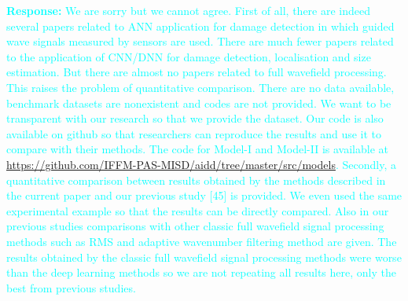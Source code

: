 \documentclass[11pt,a2paper]{report}
\begin{document}
	\textcolor{Cyan}{
		\textbf{Response:}
	We are sorry but we cannot agree. First of all, there are indeed several papers related to ANN application for damage detection in which guided wave signals measured by sensors are used. There are much fewer papers related to the application of CNN/DNN for damage detection, localisation and size estimation. But there are almost no papers related to full wavefield processing. This raises the problem of quantitative comparison. There are no data available, benchmark datasets are nonexistent and codes are not provided.
	We want to be transparent with our research so that we provide the dataset. Our code is also available on github so that researchers can reproduce the results and use it to compare with their methods. 
	The code for Model-I and Model-II is available at \url{https://github.com/IFFM-PAS-MISD/aidd/tree/master/src/models}.
	Secondly, a quantitative comparison between results obtained by the methods described in the current paper and our previous study [45] is provided. We even used the same experimental example so that the results can be directly compared. Also in our previous studies comparisons with other classic full wavefield signal processing methods such as RMS and adaptive wavenumber filtering method are given. The results obtained by the classic full wavefield signal processing methods were worse than the deep learning methods so we are not repeating all results here, only the best from previous studies.
	}

	\vspace{5mm}
	
\end{document}
